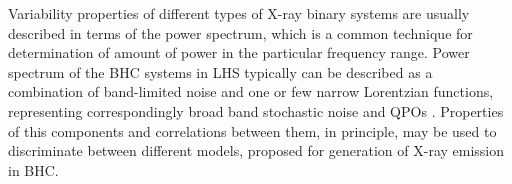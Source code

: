 \documentclass[a4paper,fleqn,usenatbib]{mnras}
\begin{document}
%
%
%

 Variability properties of different types of X-ray binary systems are usually described in terms of the power spectrum, which is a common technique for determination of amount of power in the particular frequency range. Power spectrum of the BHC systems in LHS typically can be described as a combination of band-limited noise and one or few narrow Lorentzian functions, representing correspondingly broad band stochastic noise and QPOs \citep[see, e.g.][e.t.c]{1972ApJ...174L..35T, 1990A&A...227L..33B, homan05}. Properties of this components and correlations between them, in principle, may be used to discriminate between different models, proposed for generation of X-ray emission in BHC. 
 
\end{document}
